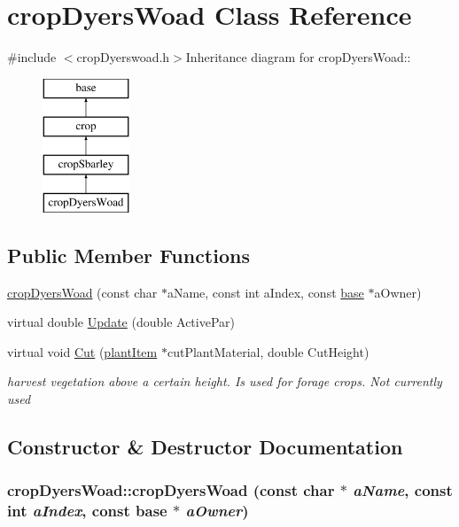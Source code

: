\hypertarget{classcrop_dyers_woad}{
\section{cropDyersWoad Class Reference}
\label{classcrop_dyers_woad}
}


{\ttfamily \#include $<$cropDyerswoad.h$>$}Inheritance diagram for cropDyersWoad::\begin{figure}[H]
\begin{center}
\leavevmode
\includegraphics[height=4cm]{classcrop_dyers_woad}
\end{center}
\end{figure}
\subsection*{Public Member Functions}
\begin{DoxyCompactItemize}
\item 
\hyperlink{classcrop_dyers_woad_af31dc1b18214f6808a295a081dce0850}{cropDyersWoad} (const char $\ast$aName, const int aIndex, const \hyperlink{classbase}{base} $\ast$aOwner)
\item 
virtual double \hyperlink{classcrop_dyers_woad_ac99e68efb5b08aa2e0208b5e925929a8}{Update} (double ActivePar)
\item 
virtual void \hyperlink{classcrop_dyers_woad_a88209c73370f84f4e7f46ab28e6a2097}{Cut} (\hyperlink{classplant_item}{plantItem} $\ast$cutPlantMaterial, double CutHeight)
\begin{DoxyCompactList}\small\item\em harvest vegetation above a certain height. Is used for forage crops. Not currently used \item\end{DoxyCompactList}\end{DoxyCompactItemize}


\subsection{Constructor \& Destructor Documentation}
\hypertarget{classcrop_dyers_woad_af31dc1b18214f6808a295a081dce0850}{
\subsubsection[{cropDyersWoad}]{\setlength{\rightskip}{0pt plus 5cm}cropDyersWoad::cropDyersWoad (const char $\ast$ {\em aName}, \/  const int {\em aIndex}, \/  const {\bf base} $\ast$ {\em aOwner})}}
\label{classcrop_dyers_woad_af31dc1b18214f6808a295a081dce0850}


